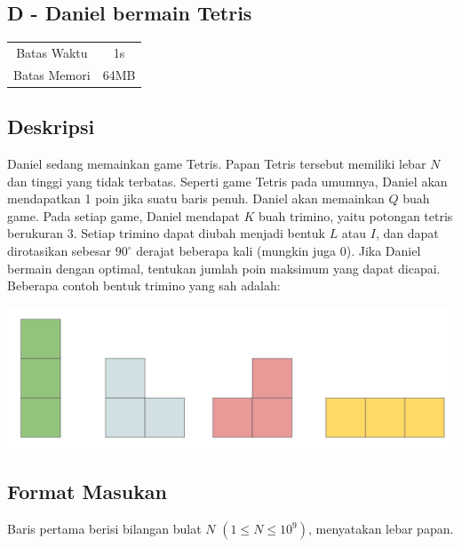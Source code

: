 \documentclass{article}
\begin{document}
\begin{center}
    \section*{D - Daniel bermain Tetris} %

    \begin{tabular}{ | c c | }
        \hline
        Batas Waktu  & 1s \\    %
        Batas Memori & 64MB \\  %
        \hline
    \end{tabular}
\end{center}

\subsection*{Deskripsi}
Daniel sedang memainkan game Tetris. Papan Tetris tersebut memiliki lebar $N$ dan tinggi yang tidak terbatas. Seperti game Tetris pada umumnya, Daniel akan mendapatkan 1 poin jika suatu baris penuh. Daniel akan memainkan $Q$ buah game. Pada setiap game, Daniel mendapat $K$ buah trimino, yaitu potongan tetris berukuran 3. Setiap trimino dapat diubah menjadi bentuk $L$ atau $I$, dan dapat dirotasikan sebesar $90^{\circ}$ derajat beberapa kali (mungkin juga 0). Jika Daniel bermain dengan optimal, tentukan jumlah poin maksimum yang dapat dicapai. Beberapa contoh bentuk trimino yang sah adalah:

\begin{center}

\includegraphics[scale=0.5]{possible.png}

\end{center}

\subsection*{Format Masukan}
Baris pertama berisi bilangan bulat $N$ $(1 \leq N \leq 10^9)$, menyatakan lebar papan.
\end{document}
